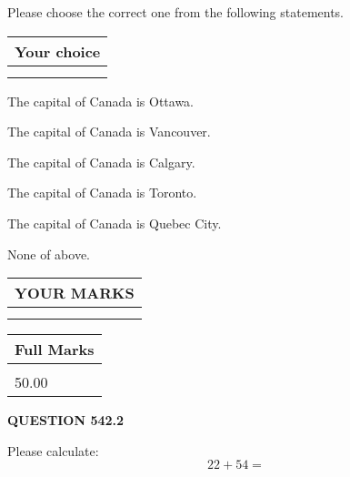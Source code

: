 \documentclass[12pt]{article}
\begin{document}
  
Please choose the correct one from the following statements.
  
  
\noindent\hspace{3.0in} \begin{tabular}{|l|}
\hline
Your choice \\
\hline
 \\ 
 \\ 
\hline
\end{tabular}
  
  
 
 
The capital of Canada is Ottawa.
 
 
The capital of Canada is Vancouver.
 
 
The capital of Canada is Calgary.
 
 
The capital of Canada is Toronto.
 
 
The capital of Canada is Quebec City.
 
 
 None of above.
 
 
  
\vspace{0.2in}
  
\noindent\begin{tabular}{|l|}
\hline
 YOUR MARKS  \\
\hline
 \\ 
 \\ 
\hline
\end{tabular}
\hspace{0.05in} \begin{tabular}{|l|}
\hline
 Full Marks  \\
\hline
 \\ 
50.00 \\
\hline
\end{tabular}
{\textbf{\Large{QUESTION
542.2 
}}}
  
  
 
Please calculate:
\begin{equation}
22 +  %
54 = \nonumber
\end{equation}
 

 

 
   
   
 \vspace{0.2in}
 
   
   
   
   
\end{document}
